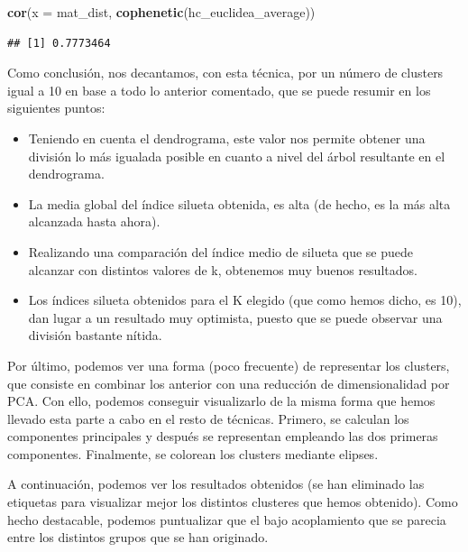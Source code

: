 \documentclass[spanish,]{article}
\newenvironment{Shaded}{\begin{snugshade}}{\end{snugshade}}
\newcommand{\KeywordTok}[1]{\textcolor[rgb]{0.13,0.29,0.53}{\textbf{#1}}}
\newcommand{\DataTypeTok}[1]{\textcolor[rgb]{0.13,0.29,0.53}{#1}}
\newcommand{\NormalTok}[1]{#1}
\providecommand{\tightlist}{%
  \setlength{\itemsep}{0pt}\setlength{\parskip}{0pt}}
\begin{document}
\begin{Shaded}
\begin{Highlighting}[]
\KeywordTok{cor}\NormalTok{(}\DataTypeTok{x =}\NormalTok{ mat_dist, }\KeywordTok{cophenetic}\NormalTok{(hc_euclidea_average)) }
\end{Highlighting}
\end{Shaded}

\begin{verbatim}
## [1] 0.7773464
\end{verbatim}

Como conclusión, nos decantamos, con esta técnica, por un número de
clusters igual a 10 en base a todo lo anterior comentado, que se puede
resumir en los siguientes puntos:

\begin{itemize}
\tightlist
\item
  Teniendo en cuenta el dendrograma, este valor nos permite obtener una
  división lo más igualada posible en cuanto a nivel del árbol
  resultante en el dendrograma.
\item
  La media global del índice silueta obtenida, es alta (de hecho, es la
  más alta alcanzada hasta ahora).
\item
  Realizando una comparación del índice medio de silueta que se puede
  alcanzar con distintos valores de k, obtenemos muy buenos resultados.
\item
  Los índices silueta obtenidos para el K elegido (que como hemos dicho,
  es 10), dan lugar a un resultado muy optimista, puesto que se puede
  observar una división bastante nítida.
\end{itemize}

Por último, podemos ver una forma (poco frecuente) de representar los
clusters, que consiste en combinar los anterior con una reducción de
dimensionalidad por PCA. Con ello, podemos conseguir visualizarlo de la
misma forma que hemos llevado esta parte a cabo en el resto de técnicas.
Primero, se calculan los componentes principales y después se
representan empleando las dos primeras componentes. Finalmente, se
colorean los clusters mediante elipses.

A continuación, podemos ver los resultados obtenidos (se han eliminado
las etiquetas para visualizar mejor los distintos clusteres que hemos
obtenido). Como hecho destacable, podemos puntualizar que el bajo
acoplamiento que se parecia entre los distintos grupos que se han
originado.
\end{document}
